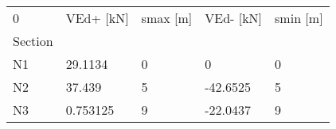 \begin{tabular}{lllll}
\toprule
0 & VEd+ [kN] & smax [m] & VEd- [kN] & smin [m] \\
Section &           &          &           &          \\
\midrule
N1      &   29.1134 &        0 &         0 &        0 \\
N2      &    37.439 &        5 &  -42.6525 &        5 \\
N3      &  0.753125 &        9 &  -22.0437 &        9 \\
\bottomrule
\end{tabular}

